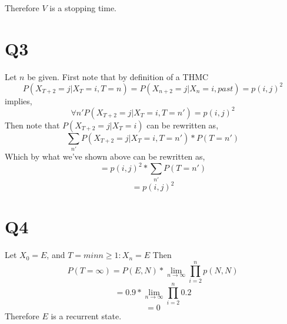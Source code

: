 \documentclass{article}
\begin{document}
Therefore $V$ is a stopping time.

\section*{Q3}
Let $n$ be given. First note that by definition of a THMC
\[
P(X_{T+2} = j | X_T = i , T = n) = P(X_{n+2} = j | X_n = i, past) = p(i,j)^2 
\]
implies,
\[
\forall n'
P(X_{T+2} = j | X_T = i , T = n') = p(i,j)^2
\]
Then note that $P(X_{T+2} = j | X_T = i)$ can be rewritten as,
\[
\sum_{n'} P(X_{T+2} = j | X_T = i, T=n')*P(T=n')
\]
Which by what we've shown above can be rewritten as,
\[
= p(i,j)^2 * \sum_{n'} P(T=n')
\] 
\[
=p(i,j)^2
\]

\section*{Q4}
Let $X_0 = E$, and $T = min{n \geq 1 : X_n = E}$
Then 
\[
P(T = \infty) = P(E,N) * \lim_{n \to \infty} \prod_{i = 2}^{n} p(N,N)
\]
\[
= 0.9 * \lim_{n \to \infty} \prod_{i = 2}^{n} 0.2
\]
\[
= 0
\]
Therefore $E$ is a recurrent state.
\end{document}
